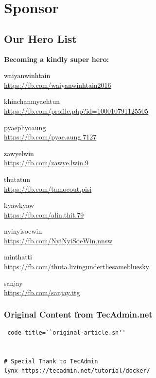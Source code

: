 \documentclass{article}
\begin{document}
\section{Sponsor}\label{sponsor}

\subsection{Our Hero List}\label{our-hero-list}

\textbf{Becoming a kindly super hero:}

waiyanwinhtain\\\href{https://fb.com/waiyanwinhtain2016}{\url{https://fb.com/waiyanwinhtain2016}}

khinchanmyaehtun\\\href{https://fb.com/profile.php?id=100010791125505}{\url{https://fb.com/profile.php?id=100010791125505}}

pyaephyoaung\\\href{https://fb.com/pyae.aung.7127}{\url{https://fb.com/pyae.aung.7127}}

zawyelwin\\\href{https://fb.com/zawye.lwin.9}{\url{https://fb.com/zawye.lwin.9}}

thutatun\\\href{https://fb.com/tamoeout.pisi}{\url{https://fb.com/tamoeout.pisi}}

kyawkyaw\\\href{https://fb.com/alin.thit.79}{\url{https://fb.com/alin.thit.79}}

nyinyisoewin\\\href{https://fb.com/NyiNyiSoeWin.nnsw}{\url{https://fb.com/NyiNyiSoeWin.nnsw}}

minthatti\\\href{https://fb.com/thuta.livingunderthesamebluesky}{\url{https://fb.com/thuta.livingunderthesamebluesky}}

sanjay\\\href{https://fb.com/sanjay.ttg}{\url{https://fb.com/sanjay.ttg}}

\subsubsection{Original Content from
TecAdmin.net}\label{original-content-from-tecadmin.net}


\begin{verbatim}
 code title=``original-article.sh'' 


# Special Thank to TecAdmin
lynx https://tecadmin.net/tutorial/docker/
\end{verbatim}
\end{document}
